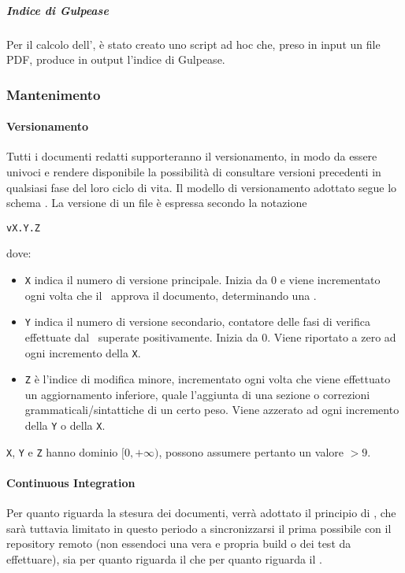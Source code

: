 			\subparagraph{Indice di Gulpease}
			Per il calcolo dell', è stato creato uno script ad hoc che, preso in input un file PDF, produce in output l'indice di Gulpease. 



		\subsubsection{Mantenimento}

			\paragraph{Versionamento} \label{Versionamento}
			Tutti i documenti redatti supporteranno il versionamento, in modo da essere univoci e rendere disponibile la possibilità di consultare versioni precedenti
			in qualsiasi fase del loro ciclo di vita.
			Il modello di versionamento adottato segue lo schema . La versione di un file è espressa secondo la notazione
			\begin{center}
				\texttt{vX.Y.Z}
			\end{center}
			\indent dove:
			\begin{itemize}
				\item \texttt{X} indica il numero di versione principale. Inizia da 0 e viene incrementato ogni volta che il \Res\ approva il documento, determinando
					una .
				\item \texttt{Y} indica il numero di versione secondario, contatore delle fasi di verifica effettuate dal \Ver\ superate positivamente. Inizia da 0. Viene riportato a zero ad
					ogni incremento della \texttt{X}.
				\item \texttt{Z} è l'indice di modifica minore, incrementato ogni volta che viene effettuato un aggiornamento inferiore, quale l'aggiunta di una sezione
					o correzioni grammaticali/sintattiche di un certo peso. Viene azzerato ad ogni incremento della \texttt{Y} o della \texttt{X}.
			\end{itemize}

			\texttt{X}, \texttt{Y} e \texttt{Z} hanno dominio $[0,+\infty)$, possono assumere pertanto un valore $> 9$.

			\paragraph{Continuous Integration}
			Per quanto riguarda la stesura dei documenti, verrà adottato il principio di , che sarà tuttavia limitato in questo periodo
			a sincronizzarsi il prima possibile con il repository remoto (non essendoci
			una vera e propria build o dei test da effettuare), sia per quanto riguarda il  che per quanto riguarda il .

